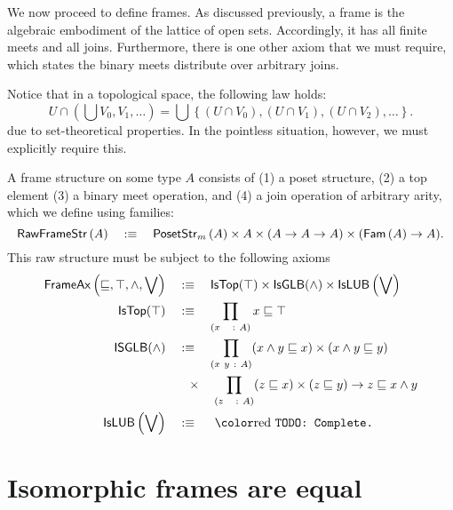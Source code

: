 We now proceed to define frames. As discussed previously, a frame is the algebraic
embodiment of the lattice of open sets. Accordingly, it has all finite meets and all
joins. Furthermore, there is one other axiom that we must require, which states the binary
meets distribute over arbitrary joins.

Notice that in a topological space, the following law holds:
\begin{equation*}
  U \cap \left( \bigcup V_0, V_1, \ldots \right) = \bigcup\left\{ (U \cap V_0), (U \cap V_1), (U \cap V_2) , \ldots \right\}.
\end{equation*}
due to set-theoretical properties. In the pointless situation, however, we must explicitly
require this.

\begin{defn}[Frame]\label{defn:frame}
  A frame structure on some type $A$ consists of (1) a poset structure, (2) a top element
  (3) a binary meet operation, and (4) a join operation of arbitrary arity, which we
  define using families:
  \begin{equation*}
    \mathsf{RawFrameStr}{}\left(A\right) \quad:\equiv\quad \mathsf{PosetStr}{}_{m}\left(A\right) \times A \times (A \rightarrow A \rightarrow A) \times (\mathsf{Fam}\left(A\right) \rightarrow A).
  \end{equation*}
  This raw structure must be subject to the following axioms
  \begin{align*}
    \frameax{\sqsubseteq, \top, \wedge, \bigvee} \quad&\is\quad
      \mathsf{IsTop}(\top) \times \mathsf{IsGLB}(\wedge) \times \mathsf{IsLUB}\left(\bigvee\right)\\
    \mathsf{IsTop}(\top) \quad&\is\quad \pity{x~~}{A}{x \sqsubseteq \top}\\
    \mathsf{ISGLB}(\wedge) \quad&\is\quad \pity{x~y}{A}{(x \wedge y \sqsubseteq x) \times (x \wedge y \sqsubseteq y)}\\
                       &\hspace{0.7em}\times\quad \pity{z~~}{A}{(z \sqsubseteq x) \times (z \sqsubseteq y) \rightarrow z \sqsubseteq x \wedge y}\\
    \mathsf{IsLUB}\left(\bigvee\right) \quad&\is\quad \text{\todo{Complete.}}
  \end{align*}
\end{defn}

\section{Isomorphic frames are equal}\label{sec:frame-univ}

